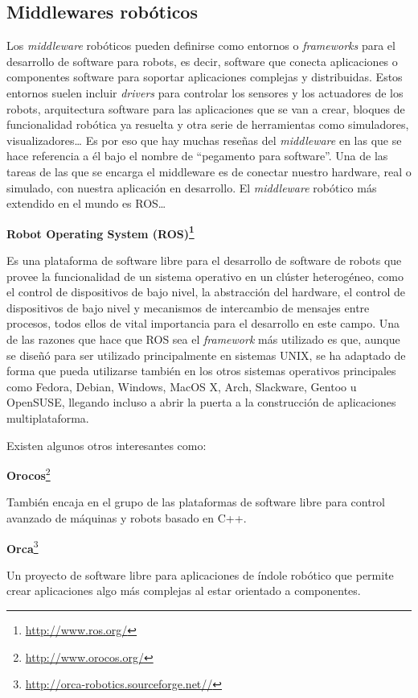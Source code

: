 \subsection{Middlewares robóticos}
Los \textit{middleware} robóticos pueden definirse como entornos o \textit{frameworks} para el desarrollo de software para robots, es decir, software que conecta aplicaciones o componentes software para soportar aplicaciones complejas y distribuidas. Estos entornos suelen incluir \textit{drivers} para controlar los sensores y los actuadores de los robots, arquitectura software para las aplicaciones que se van a crear, bloques de funcionalidad robótica ya resuelta y otra serie de herramientas como simuladores, visualizadores… Es por eso que hay muchas reseñas del \textit{middleware} en las que se hace referencia a él bajo el nombre de “pegamento para software”. Una de las tareas de las que se encarga el middleware es de conectar nuestro hardware, real o simulado, con nuestra aplicación en desarrollo. El \textit{middleware} robótico más extendido en el mundo es ROS…

	\textbf{Robot Operating System (ROS)\footnote{\url{http://www.ros.org/}}}
	
Es una plataforma de software libre para el desarrollo de software de robots que provee la funcionalidad de un sistema operativo en un clúster heterogéneo, como el control de dispositivos de bajo nivel, la abstracción del hardware, el control de dispositivos de bajo nivel y mecanismos de intercambio de mensajes entre procesos, todos ellos de vital importancia para el desarrollo en este campo. Una de las razones que hace que ROS sea el \textit{framework} más utilizado es que, aunque se diseñó para ser utilizado principalmente en sistemas UNIX, se ha adaptado de forma que pueda utilizarse también en los otros sistemas operativos principales como Fedora, Debian,  Windows, MacOS X, Arch, Slackware, Gentoo u OpenSUSE, llegando incluso a abrir la puerta a la construcción de aplicaciones multiplataforma.

Existen algunos otros interesantes como: 

	\textbf{Orocos}\footnote{\url{http://www.orocos.org/}}
	
También encaja en el grupo de las plataformas de software libre para control avanzado de máquinas y robots basado en C++.
 
	\textbf{Orca}\footnote{\url{http://orca-robotics.sourceforge.net//}}
	
Un proyecto de software libre para aplicaciones de índole robótico que permite crear aplicaciones algo más complejas al estar orientado a componentes.

